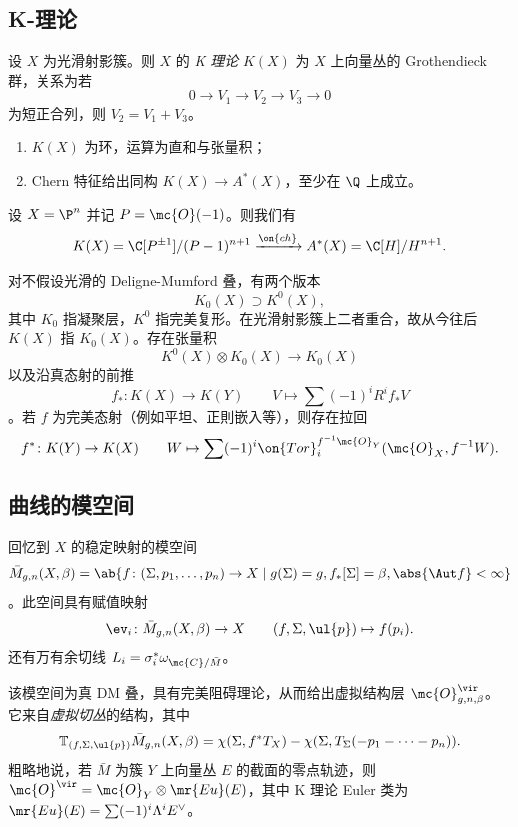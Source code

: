 \subsection{K-理论}%
\label{sub:K-theory}

\begin{defn}
    设 \(X\) 为光滑射影簇。则 \(X\) 的 \textit{K 理论} \(K(X)\) 为 \(X\) 上向量丛的 Grothendieck 群，关系为若
    \[ 0 \to V_1 \to V_2 \to V_3 \to 0 \]
    为短正合列，则 \(V_2 = V_1 + V_3\)。
\end{defn}

\begin{rmk}\leavevmode
    \begin{enumerate}
        \item \(K(X)\) 为环，运算为直和与张量积；
        \item Chern 特征给出同构 \(K(X) \to A^*(X)\)，至少在 \(\Q\) 上成立。
    \end{enumerate}
\end{rmk}

\begin{exm}
    设 \(X = \P^n\) 并记 \(P = \mc{O}(-1)\)。则我们有
    \[ K(X) = \C[P^{\pm 1}]/(P-1)^{n+1} \xrightarrow{\on{ch}} A^*(X) = \C[H]/H^{n+1}. \]
\end{exm}

对不假设光滑的 Deligne-Mumford 叠，有两个版本
\[ K_0(X) \supset K^0(X), \]
其中 \(K_0\) 指凝聚层，\(K^0\) 指完美复形。在光滑射影簇上二者重合，故从今往后 \(K(X)\) 指 \(K_0(X)\)。存在张量积
\[ K^0(X) \otimes K_0(X) \to K_0(X) \]
以及沿真态射的前推
\[ f_* \colon K(X) \to K(Y) \qquad V \mapsto \sum (-1)^i R^i f_* V \]
。若 \(f\) 为完美态射（例如平坦、正則嵌入等），则存在拉回
\[ f^* \colon K(Y) \to K(X) \qquad W \mapsto \sum (-1)^i \on{Tor}_i^{f^{-1} \mc{O}_Y} (\mc{O}_X, f^{-1} W). \]

\subsection{曲线的模空间}%
\label{sub:Moduli of curves}

回忆到 \(X\) 的稳定映射的模空间
\[ \bar{M}_{g,n}(X, \beta) = \ab\{ f \colon (\Sigma, p_1, \ldots, p_n) \to X \mid g(\Sigma) = g, f_*[\Sigma] = \beta, \abs{\Aut f} < \infty \} \]
。此空间具有赋值映射
\[ \ev_i \colon \bar{M}_{g,n}(X, \beta) \to X \qquad (f, \Sigma, \ul{p}) \mapsto f(p_i). \]
还有万有余切线 \(L_i = \sigma_i^* \omega_{ \mc{C}/\bar{M} }\)。

该模空间为真 DM 叠，具有完美阻碍理论，从而给出虚拟结构层 \(\mc{O}^{\vir}_{g,n,\beta}\)。它来自\textit{虚拟切丛}的结构，其中
\[ \mathbb{T}_{(f, \Sigma, \ul{p})} \bar{M}_{g,n}(X, \beta) = \chi(\Sigma, f^* T_X) - \chi(\Sigma, T_{\Sigma}(-p_1 - \cdots - p_n)). \]
粗略地说，若 \(\bar{M}\) 为簇 \(Y\) 上向量丛 \(E\) 的截面的零点轨迹，则 \(\mc{O}^{\vir} = \mc{O}_Y \otimes \mr{Eu}(E)\)，其中 K 理论 Euler 类为 \(\mr{Eu}(E) = \sum (-1)^i \Lambda^i E^{\vee}\)。

